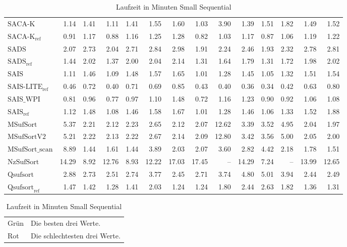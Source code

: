 \begin{table}[h]
{\begin{tabular}{lrrrrrrrrrrrrr}
    $\text{SACA-K}$ & 1.14 & 1.41 & 1.11 & 1.41 & 1.55 & 1.60 & 1.03 & 3.90 & 1.39 & 1.51 & 1.82 & 1.49 & 1.52 \\
    $\text{SACA-K}_{\text{ref}}$ & 0.91 & 1.17 & 0.88 & 1.16 & 1.25 & 1.28 & 0.82 & 1.03 & 1.17 & 0.87 & 1.06 & 1.19 & 1.22 \\
    $\text{SADS}$ & 2.07 & 2.73 & 2.04 & 2.71 & 2.84 & 2.98 & 1.91 & 2.24 & 2.46 & 1.93 & 2.32 & 2.78 & 2.81 \\
    $\text{SADS}_{\text{ref}}$ & 1.44 & 2.02 & 1.37 & 2.00 & 2.04 & 2.14 & 1.31 & 1.64 & 1.79 & 1.31 & 1.72 & 1.98 & 2.02 \\
    $\text{SAIS}$ & 1.11 & 1.46 & 1.09 & 1.48 & 1.57 & 1.65 & 1.01 & 1.28 & 1.45 & 1.05 & 1.32 & 1.51 & 1.54 \\
    $\text{SAIS-LITE}_{\text{ref}}$ & {\color{green!60!black}0.46} & 0.72 & {\color{green!60!black}0.40} & 0.71 & 0.69 & 0.85 & {\color{green!60!black}0.43} & {\color{green!60!black}0.40} & {\color{green!60!black}0.36} & {\color{green!60!black}0.34} & {\color{green!60!black}0.42} & 0.63 & 0.80 \\
    $\text{SAIS\_WPI}$ & 0.81 & 0.96 & 0.77 & 0.97 & 1.10 & 1.48 & 0.72 & 1.16 & 1.23 & 0.90 & 0.92 & 1.06 & 1.08 \\
    $\text{SAIS}_{\text{ref}}$ & 1.12 & 1.48 & 1.08 & 1.46 & 1.58 & 1.67 & 1.01 & 1.28 & 1.46 & 1.06 & 1.33 & 1.52 & 1.88 \\
    $\text{MSufSort}$ & 5.37 & 2.21 & 2.12 & 2.23 & 2.65 & 2.12 & 2.07 & {\color{red}12.62} & 3.39 & 3.52 & 4.95 & 2.04 & 1.97 \\
    $\text{MSufSortV2}$ & 5.21 & 2.22 & 2.13 & 2.22 & 2.67 & 2.14 & 2.09 & {\color{red}12.80} & 3.42 & 3.56 & 5.00 & 2.05 & 2.00 \\
    $\text{MSufSort\_scan}$ & 8.89 & 1.44 & 1.61 & 1.44 & 3.89 & 2.03 & 2.07 & 3.60 & 2.82 & 4.42 & 2.18 & 1.78 & 1.51 \\
    $\text{NzSufSort}$ & {\color{red}14.29} & {\color{red}8.92} & {\color{red}12.76} & {\color{red}8.93} & 12.22 & {\color{red}17.03} & {\color{red}17.45} & {\color{darkgray}--} & 14.29 & 7.24 & {\color{darkgray}--} & {\color{red}13.99} & {\color{red}12.65} \\
    $\text{Qsufsort}$ & 2.88 & 2.73 & 2.51 & 2.74 & 3.77 & 2.45 & 2.71 & 3.74 & 4.80 & 5.01 & 3.94 & 2.44 & 2.49 \\
    $\text{Qsufsort}_{\text{ref}}$ & 1.47 & 1.42 & 1.28 & 1.41 & 2.03 & 1.24 & 1.24 & 1.80 & 2.44 & 2.63 & 1.82 & 1.36 & 1.31 \\
\bottomrule
\end{tabular}
}
\caption{Laufzeit in Minuten Small Sequential}
\label{messung:tab:time-small-seq-none}
\begin{tabular}{ll}
{\color{green}Grün} & Die besten drei Werte.\\
{\color{red}Rot} & Die schlechtesten drei Werte.\\
\end{tabular}
\end{table}
